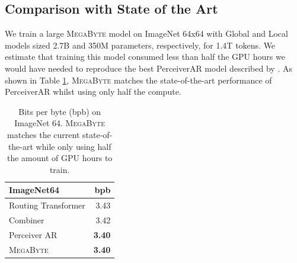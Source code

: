 \documentclass{article}
\newcommand{\fastslow}[0]{\textsc{MegaByte}\xspace}
\newcommand{\megabyte}[0]{\fastslow}
\newcommand{\bpb}[0]{bpb\xspace}
\newcommand{\todo}[1]{\textcolor{red}{[TODO: #1]}}
\newcommand{\mike}[1]{\textcolor{blue}{[Mike: #1]}}
\theoremstyle{plain}
\theoremstyle{definition}
\theoremstyle{remark}
\begin{document}




\subsection{Comparison with State of the Art}


We train a large \megabyte model on ImageNet 64x64 with Global and Local models sized 2.7B and 350M parameters, respectively, for 1.4T tokens. We estimate that training this model consumed less than half the GPU hours we would have needed to reproduce the best PerceiverAR model described by \citep{perceiverar}. %
As shown in Table \ref{tab:img_sota}, \megabyte matches the state-of-the-art performance of PerceiverAR whilst using only half the compute.


\begin{table}[h]
\centering
\begin{tabular}{lr}
\toprule
{ImageNet64} & \bpb\\
\midrule
Routing Transformer \citep{routing} & 3.43 \\
Combiner \citep{combiner} & 3.42 \\
Perceiver AR \citep{perceiverar} & \textbf{3.40}  \\
\megabyte &  \textbf{3.40} \\
\bottomrule
\end{tabular}
\caption{Bits per byte (\bpb) on ImageNet 64.  \megabyte matches the current state-of-the-art while only using half the amount of GPU hours to train.}
\label{tab:img_sota}
\end{table}
\end{document}

